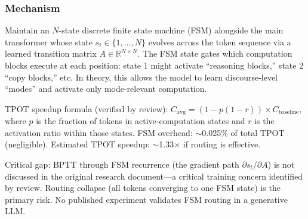 \documentclass[11pt]{article}
\begin{document}
\subsubsection*{Mechanism}
Maintain an $N$-state discrete finite state machine (FSM) alongside the main transformer whose state $s_t \in \{1,\ldots,N\}$ evolves across the token sequence via a learned transition matrix $A \in \mathbb{R}^{N \times N}$.
The FSM state gates which computation blocks execute at each position: state 1 might activate ``reasoning blocks,'' state 2 ``copy blocks,'' etc.
In theory, this allows the model to learn discourse-level ``modes'' and activate only mode-relevant computation.

TPOT speedup formula (verified by review): $C_\text{avg} = (1 - p(1-r)) \times C_\text{baseline}$, where $p$ is the fraction of tokens in active-computation states and $r$ is the activation ratio within those states.
FSM overhead: $\sim$0.025\% of total TPOT (negligible).
Estimated TPOT speedup: $\sim$1.33$\times$ if routing is effective.

Critical gap: BPTT through FSM recurrence (the gradient path $\partial s_t / \partial A$) is not discussed in the original research document---a critical training concern identified by review.
Routing collapse (all tokens converging to one FSM state) is the primary risk.
No published experiment validates FSM routing in a generative LLM.
\end{document}
